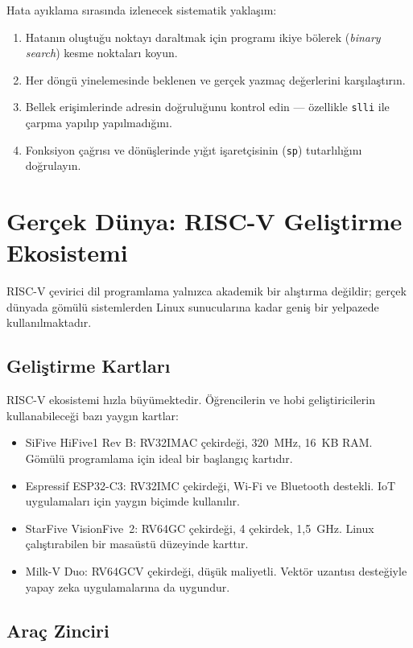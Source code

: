 Hata ayıklama sırasında izlenecek sistematik yaklaşım:
\begin{enumerate}
\item Hatanın oluştuğu noktayı daraltmak için programı ikiye bölerek (\emph{binary search}) kesme noktaları koyun.
\item Her döngü yinelemesinde beklenen ve gerçek yazmaç değerlerini karşılaştırın.
\item Bellek erişimlerinde adresin doğruluğunu kontrol edin --- özellikle \texttt{slli} ile çarpma yapılıp yapılmadığını.
\item Fonksiyon çağrısı ve dönüşlerinde yığıt işaretçisinin (\texttt{sp}) tutarlılığını doğrulayın.
\end{enumerate}


\section{Gerçek Dünya: RISC-V Geliştirme Ekosistemi}
\label{sec:gercek-dunya-programlama}

RISC-V çevirici dil programlama yalnızca akademik bir alıştırma değildir; gerçek dünyada gömülü sistemlerden Linux sunucularına kadar geniş bir yelpazede kullanılmaktadır.

\subsection{Geliştirme Kartları}

RISC-V ekosistemi hızla büyümektedir. Öğrencilerin ve hobi geliştiricilerin kullanabileceği bazı yaygın kartlar:

\begin{itemize}
\item SiFive HiFive1 Rev B: RV32IMAC çekirdeği, 320~MHz, 16~KB RAM. Gömülü programlama için ideal bir başlangıç kartıdır.
\item Espressif ESP32-C3: RV32IMC çekirdeği, Wi-Fi ve Bluetooth destekli. IoT uygulamaları için yaygın biçimde kullanılır.
\item StarFive VisionFive~2: RV64GC çekirdeği, 4 çekirdek, 1,5~GHz. Linux çalıştırabilen bir masaüstü düzeyinde karttır.
\item Milk-V Duo: RV64GCV çekirdeği, düşük maliyetli. Vektör uzantısı desteğiyle yapay zeka uygulamalarına da uygundur.
\end{itemize}

\subsection{Araç Zinciri}

